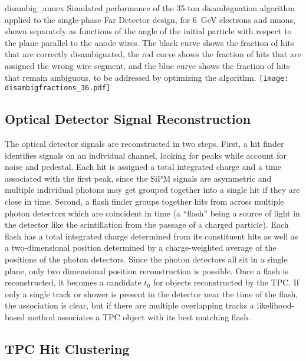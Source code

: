 \begin{cdrfigure}{disambig_annex}
{Simulated performance of the 35-ton disambiguation algorithm applied to the single-phase Far Detector
design, for 6~GeV electrons and muons, shown separately as functions of the angle of the initial particle
with respect to the plane parallel to the anode wires.  The black curve shows the fraction of hits that
are correctly disambiguated, the red curve shows the fraction of hits that are assigned the wrong wire segment,
and the blue curve shows the fraction of hits that remain ambiguous, to be addressed by optimizing the algorithm.}
\texttt{[image: disambigfractions\_36.pdf]}
\end{cdrfigure}

\subsection{Optical Detector Signal Reconstruction}

The optical detector signals are reconstructed in two steps.  First, a
hit finder identifies signals on an individual channel, looking for
peaks while account for noise and pedestal.  Each hit is assigned a
total integrated charge and a time associated with the first peak,
since the SiPM signals are asymmetric and multiple individual photons
may get grouped together into a single hit if they are close in time.
Second, a flash finder groups together hits from across multiple
photon detectors which are coincident in time (a ``flash'' being a
source of light in the detector like the scintillation from the
passage of a charged particle).  Each flash has a total integrated
charge determined from its constituent hits as well as a
two-dimensional position determined by a charge-weighted average of
the positions of the photon detectors.  Since the photon detectors all
sit in a single plane, only two dimensional position reconstruction is
possible.  Once a flash is reconstructed, it becomes a candidate $t_0$
for objects reconstructed by the TPC.  If only a single track or
shower is present in the detector near the time of the flash, the
association is clear, but if there are multiple overlapping tracks a
likelihood-based method associates a TPC object with its best matching
flash.


\subsection{TPC Hit Clustering}

